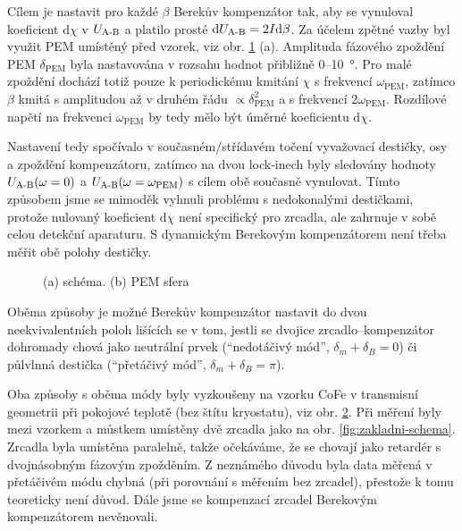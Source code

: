 Cílem je nastavit pro každé $\beta$ Berekův kompenzátor tak, aby se vynuloval koeficient $\textrm{d}\chi$ v $U_\textrm{A-B}$ a platilo prosté $\textrm{d}U_\textrm{A-B}=2I\textrm{d}\beta$.
Za účelem zpětné vazby byl využit PEM umístěný před vzorek, viz obr. \ref{fig:dynamicky-berek} (a).
Amplituda fázového zpoždění PEM $\delta_\textrm{PEM}$ byla nastavována v rozsahu hodnot přibližně 0--\SI{10}{\degree}.
Pro malé zpoždění dochází totiž pouze k periodickému kmitání $\chi$ s frekvencí $\omega_\textrm{PEM}$, zatímco $\beta$ kmitá s amplitudou až v druhém řádu $\propto\delta_\textrm{PEM}^2$ a s frekvencí $2\omega_\textrm{PEM}$.
Rozdílové napětí na frekvenci $\omega_\textrm{PEM}$ by tedy mělo být úměrné koeficientu $\textrm{d}\chi$.

Nastavení tedy spočívalo v současném/střídavém točení vyvažovací destičky, osy a zpoždění kompenzátoru, zatímco na dvou lock-inech byly sledovány hodnoty $U_\textrm{A-B}(\omega=0)$ a $U_\textrm{A-B}(\omega=\omega_\textrm{PEM})$ s cílem obě současně vynulovat.
Tímto způsobem jsme se mimoděk vyhnuli problému s nedokonalými destičkami, protože nulovaný koeficient $\textrm{d}\chi$ není specifický pro zrcadla, ale zahrnuje v sobě celou detekční aparaturu.
S dynamickým Berekovým kompenzátorem není třeba měřit obě polohy destičky.


\begin{figure}[htbp]
    \centering
    \missingfigure{}
    \caption{(a) schéma. (b) PEM sfera}
    \label{fig:dynamicky-berek}
\end{figure}

Oběma způsoby je možné Berekův kompenzátor nastavit do dvou neekvivalentních poloh lišících se v tom, jestli se dvojice zrcadlo--kompenzátor dohromady chová jako neutrální prvek (``nedotáčivý mód'', $\delta_m+\delta_B=0$) či půlvlnná destička (``přetáčivý mód'', $\delta_m+\delta_B=\pi$).

Oba způsoby s oběma módy byly vyzkoušeny na vzorku CoFe v transmisní geometrii při pokojové teplotě (bez štítu kryostatu), viz obr. \ref{fig:g:mustek-kompenzace-berek-vysledky}.
Při měření byly mezi vzorkem a můstkem umístěny dvě zrcadla jako na obr. \ref{fig:zakladni-schema}.
Zrcadla byla umístěna paralelně, takže očekáváme, že se chovají jako retardér s dvojnásobným fázovým zpožděním.
Z neznámého důvodu byla data měřená v přetáčivém módu chybná (při porovnání s měřením bez zrcadel), přestože k tomu teoreticky není důvod.
Dále jsme se kompenzací zrcadel Berekovým kompenzátorem nevěnovali.

\begin{figure}[htbp]
    \centering
    \missingfigure{}
    \caption{}
    \label{fig:g:mustek-kompenzace-berek-vysledky}
\end{figure}

